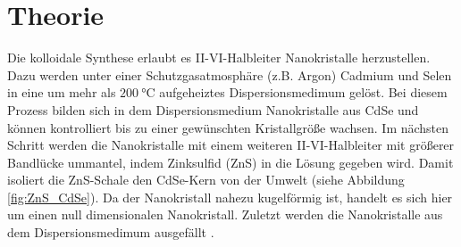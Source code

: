 \section{Theorie}
\label{sec:Theorie}


Die kolloidale Synthese erlaubt es II-VI-Halbleiter Nanokristalle herzustellen.
Dazu werden unter einer Schutzgasatmosphäre (z.B. Argon) Cadmium und Selen in
eine um mehr als $\SI{200}{\degreeCelsius}$ aufgeheiztes Dispersionsmedimum
gelöst. Bei diesem Prozess bilden sich in dem Dispersionsmedium Nanokristalle
aus CdSe und können kontrolliert bis zu einer gewünschten Kristallgröße wachsen.
Im nächsten Schritt werden die Nanokristalle mit einem weiteren II-VI-Halbleiter
mit größerer Bandlücke ummantel, indem Zinksulfid (ZnS) in die Lösung gegeben wird.
Damit isoliert die ZnS-Schale den CdSe-Kern von der Umwelt (siehe Abbildung
\ref{fig:ZnS_CdSe}). Da der Nanokristall nahezu kugelförmig ist, handelt es sich
hier um einen null dimensionalen Nanokristall. Zuletzt werden die Nanokristalle
aus dem Dispersionsmedimum ausgefällt \cite{komp}.\\

